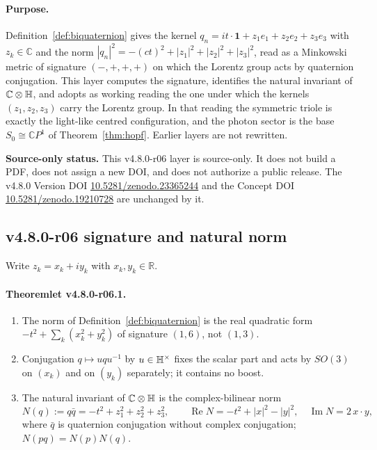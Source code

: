 \paragraph{Purpose.}
Definition~\ref{def:biquaternion} gives the kernel
\(q_n=it\cdot\mathbf 1+z_1e_1+z_2e_2+z_3e_3\) with \(z_k\in\mathbb C\) and the norm
\(|q_n|^2=-(ct)^2+|z_1|^2+|z_2|^2+|z_3|^2\), read as a Minkowski metric of signature
\((-,+,+,+)\) on which the Lorentz group acts by quaternion conjugation.  This layer computes
the signature, identifies the natural invariant of \(\mathbb C\otimes\mathbb{H}\), and adopts as working
reading the one under which the kernels \((z_1,z_2,z_3)\) carry the Lorentz group.  In that reading
the symmetric triole is exactly the light-like centred configuration, and the photon sector is the
base \(S_0\cong\mathbb CP^1\) of Theorem~\ref{thm:hopf}.  Earlier layers are not rewritten.

\noindent\textbf{Source-only status.}
This v4.8.0-r06 layer is source-only.  It does not build a PDF, does not assign a new DOI,
and does not authorize a public release.  The v4.8.0 Version DOI
\href{https://doi.org/10.5281/zenodo.23365244}{10.5281/zenodo.23365244} and the Concept DOI
\href{https://doi.org/10.5281/zenodo.19210728}{10.5281/zenodo.19210728} are unchanged by it.

\subsection*{v4.8.0-r06 signature and natural norm}
\label{subsec:v480-r06-signature}

Write \(z_k=x_k+iy_k\) with \(x_k,y_k\in\mathbb R\).

\paragraph{Theoremlet v4.8.0-r06.1.}
\begin{enumerate}[label=(\roman*)]
\item The norm of Definition~\ref{def:biquaternion} is the real quadratic form
\(-t^2+\sum_k(x_k^2+y_k^2)\) of signature \((1,6)\), not \((1,3)\).
\item Conjugation \(q\mapsto uqu^{-1}\) by \(u\in\mathbb{H}^\times\) fixes the scalar part and acts by
\(SO(3)\) on \((x_k)\) and on \((y_k)\) separately; it contains no boost.
\item The natural invariant of \(\mathbb C\otimes\mathbb{H}\) is the complex-bilinear norm
\[
N(q):=q\bar q=-t^2+z_1^2+z_2^2+z_3^2,\qquad
\operatorname{Re}N=-t^2+|x|^2-|y|^2,\quad \operatorname{Im}N=2\,x\cdot y,
\]
where \(\bar q\) is quaternion conjugation without complex conjugation; \(N(pq)=N(p)N(q)\).
\end{enumerate}


